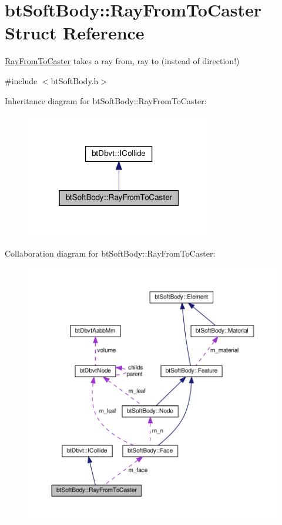 \hypertarget{structbtSoftBody_1_1RayFromToCaster}{}\section{bt\+Soft\+Body\+:\+:Ray\+From\+To\+Caster Struct Reference}
\label{structbtSoftBody_1_1RayFromToCaster}


\hyperlink{structbtSoftBody_1_1RayFromToCaster}{Ray\+From\+To\+Caster} takes a ray from, ray to (instead of direction!)  




{\ttfamily \#include $<$bt\+Soft\+Body.\+h$>$}



Inheritance diagram for bt\+Soft\+Body\+:\+:Ray\+From\+To\+Caster\+:
\nopagebreak
\begin{figure}[H]
\begin{center}
\leavevmode
\includegraphics[width=232pt]{structbtSoftBody_1_1RayFromToCaster__inherit__graph}
\end{center}
\end{figure}


Collaboration diagram for bt\+Soft\+Body\+:\+:Ray\+From\+To\+Caster\+:
\nopagebreak
\begin{figure}[H]
\begin{center}
\leavevmode
\includegraphics[width=350pt]{structbtSoftBody_1_1RayFromToCaster__coll__graph}
\end{center}
\end{figure}
